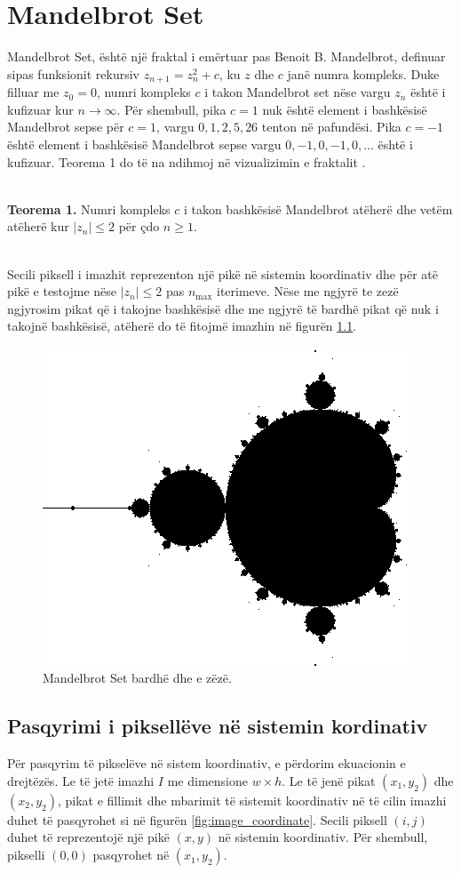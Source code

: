 \chapter{Mandelbrot Set}

\noindent Mandelbrot Set, është një fraktal i emërtuar pas Benoit B. Mandelbrot, definuar sipas funksionit rekursiv \( z_{n+1} = z_n^2 + c \), ku \( z \) dhe \( c \) janë numra kompleks. Duke filluar me \( z_0 = 0 \), numri kompleks \( c \) i takon Mandelbrot set nëse vargu \( z_n \) është i kufizuar kur \( n \to \infty \). Për shembull, pika \( c = 1 \) nuk është element i bashkësisë Mandelbrot sepse për \( c = 1 \), vargu \( 0, 1, 2, 5, 26 \) tenton në pafundësi. Pika \( c = -1 \) është element i bashkësisë Mandelbrot sepse vargu \( 0, -1, 0, -1, 0, \ldots \) është i kufizuar. Teorema 1 do të na ndihmoj në vizualizimin e fraktalit \cite{complex_analysis}.

\noindent \\ \textbf{Teorema 1.} Numri kompleks \( c \) i takon bashkësisë Mandelbrot atëherë dhe vetëm atëherë kur \( |z_n| \leq 2 \) për çdo \( n \geq 1 \).

\noindent \\Secili piksell i imazhit reprezenton një pikë në sistemin koordinativ dhe për atë pikë e testojme nëse \( |z_n| \leq 2 \) pas \(n_\text{max}\) iterimeve. Nëse me ngjyrë te zezë ngjyrosim pikat që i takojne bashkësisë dhe me ngjyrë të bardhë pikat që nuk i takojnë bashkësisë, atëherë do të fitojmë imazhin në figurën \ref{fig:mandelbrot_bw}.

\begin{figure}[h]
    \centering
    \includegraphics[width=0.4\linewidth]{mandelbrot_1.png}
    \caption{Mandelbrot Set bardhë dhe e zëzë.}
    \label{fig:mandelbrot_bw}
\end{figure}

\section{Pasqyrimi i piksellëve në sistemin kordinativ}
Për pasqyrim të pikselëve në sistem koordinativ, e përdorim ekuacionin e drejtëzës. Le të jetë 
imazhi \(I\) me dimensione \(w \times h\). Le të jenë pikat \((x_1, y_2)\) dhe \((x_2, y_2)\), pikat e fillimit dhe mbarimit 
të sistemit koordinativ në të cilin imazhi duhet të pasqyrohet si në figurën \ref{fig:image_coordinate}. Secili piksell \((i, j)\) duhet të 
reprezentojë një pikë \((x, y)\) në sistemin koordinativ. Për shembull, pikselli \((0, 0)\) pasqyrohet në \((x_1, y_2)\).



